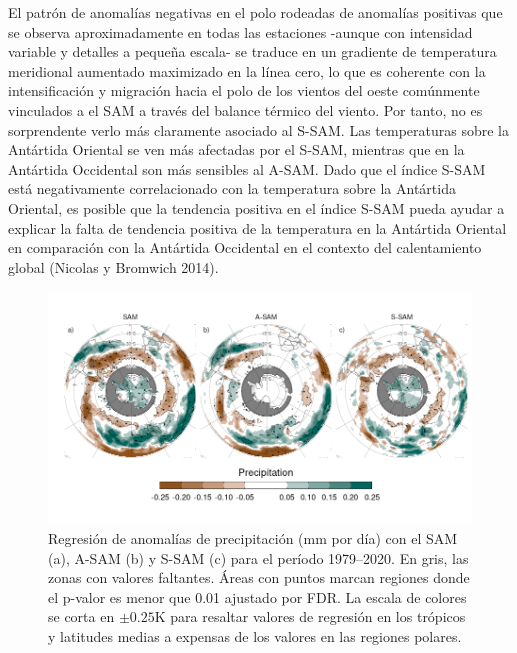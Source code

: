 \documentclass[12pt,oneside,a4paper]{reedthesis}
\begin{document}
El patrón de anomalías negativas en el polo rodeadas de anomalías positivas que se observa aproximadamente en todas las estaciones -aunque con intensidad variable y detalles a pequeña escala- se traduce en un gradiente de temperatura meridional aumentado maximizado en la línea cero, lo que es coherente con la intensificación y migración hacia el polo de los vientos del oeste comúnmente vinculados a el SAM a través del balance térmico del viento.
Por tanto, no es sorprendente verlo más claramente asociado al S-SAM.
Las temperaturas sobre la Antártida Oriental se ven más afectadas por el S-SAM, mientras que en la Antártida Occidental son más sensibles al A-SAM.
Dado que el índice S-SAM está negativamente correlacionado con la temperatura sobre la Antártida Oriental, es posible que la tendencia positiva en el índice S-SAM pueda ayudar a explicar la falta de tendencia positiva de la temperatura en la Antártida Oriental en comparación con la Antártida Occidental en el contexto del calentamiento global (Nicolas y Bromwich 2014).



\begin{figure}

{\centering \includegraphics{figures/30-sam/global-pp-1} 

}

\caption{Regresión de anomalías de precipitación (mm por día) con el SAM (a), A-SAM (b) y S-SAM (c) para el período 1979--2020. En gris, las zonas con valores faltantes. Áreas con puntos marcan regiones donde el p-valor es menor que 0.01 ajustado por FDR. La escala de colores se corta en \(\pm0.25 \mathrm{K}\) para resaltar valores de regresión en los trópicos y latitudes medias a expensas de los valores en las regiones polares.}\label{fig:global-pp}
\end{figure}
\end{document}
